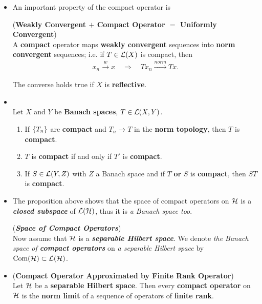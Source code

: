 \documentclass[11pt]{article}
\begin{document}
\begin{itemize}
\item An important property of the compact operator is 
\begin{theorem} (\textbf{Weakly Convergent $+$ Compact Operator $=$ Uniformly Convergent}) \citep{reed1980methods}\\
A \textbf{compact} operator maps \textbf{weakly convergent} sequences into \textbf{norm convergent} sequences; i.e. if $T \in {\mathcal L}(X)$ is compact, then
\begin{align*}
x_n \stackrel{w}{\rightarrow} x \quad \Rightarrow \quad Tx_{n} \stackrel{norm}{\rightarrow} Tx.
\end{align*}

The converse holds true if $X$ is \textbf{reflective}.
\end{theorem}

\item \begin{proposition} \citep{reed1980methods}\\
Let $X$ and $Y$ be \textbf{Banach spaces}, $T \in {\mathcal L}(X, Y)$.
\begin{enumerate}
\item If  $\left\{T_n\right\}$ are \textbf{compact} and $T_n \rightarrow T$ in the \textbf{norm topology}, then $T$ is  \textbf{compact}. 
\item $T$ is \textbf{compact} if and only if $T'$ is \textbf{compact}. 
\item If $S \in {\mathcal L}(Y,  Z)$ with $Z$ a Banach space and if $T$ \textbf{or} $S$ is \textbf{compact}, then $ST$ is \textbf{compact}. 
\end{enumerate} 
\end{proposition}

\item The proposition above shows that the space of compact operators on ${\mathcal H}$ is a \emph{\textbf{closed subspace}} of ${\mathcal L}({\mathcal H})$, thus it is \emph{a Banach space too}.
\begin{definition} (\textbf{\emph{Space of Compact Operators}})\\
Now assume that ${\mathcal H}$ is a \emph{\textbf{separable Hilbert space}}. We denote \emph{the Banach space of \textbf{compact operators}} on \emph{a separable Hilbert space} by $\text{Com}({\mathcal H}) \subset {\mathcal L}({\mathcal H})$. 
\end{definition}

\item 
\begin{theorem} (\textbf{Compact Operator Approximated by Finite Rank Operator})\citep{reed1980methods}\\
Let ${\mathcal H}$ be a \textbf{separable Hilbert space}. Then every \textbf{compact operator} on ${\mathcal H}$ is the \textbf{norm limit} of a sequence of operators of \textbf{finite rank}. 
\end{theorem}

\end{itemize}
\end{document}
